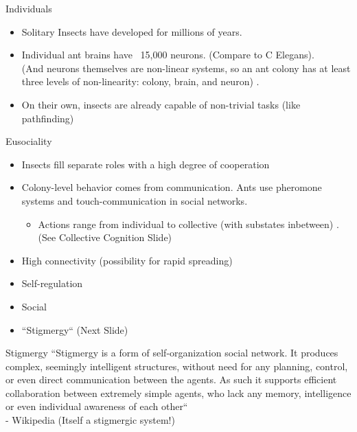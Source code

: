 \documentclass{beamer}
\newcommand\tab[1][1cm]{\hspace*{#1}}
\begin{document}
  \begin{frame}{Individuals}
      \begin{itemize}
          \item Solitary Insects have developed for millions of years.
          \item Individual ant brains have ~15,000 neurons. (Compare to C Elegans). \\
              \tiny (And neurons themselves are non-linear systems, so an ant colony has at least three levels of non-linearity: colony, brain, and neuron) \cite{koch_1999}. \normalsize
          \item On their own, insects are already capable of non-trivial tasks (like pathfinding)
      \end{itemize}
  \end{frame}

  \begin{frame}{Eusociality}
      \begin{itemize}
          \item Insects fill separate roles with a high degree of cooperation \normalsize \cite{gelblum2015ant}
          \item Colony-level behavior comes from communication. Ants use pheromone systems and touch-communication in social networks. \cite{fewell_2003}
              \begin{itemize}
                  \item Actions range from individual to collective (with substates inbetween) \cite{feinerman2017individual}. \tiny (See Collective Cognition Slide) \normalsize
              \end{itemize}
          \item High connectivity (possibility for rapid spreading) \cite{gernat2018automated}
          \item Self-regulation \cite{heyman2017ants}
          \item Social
          \item ``Stigmergy`` (Next Slide) \cite{fonio2016locally}
      \end{itemize}
  \end{frame}

  \begin{frame}{Stigmergy}
      ``Stigmergy is a form of self-organization social network. It produces complex, seemingly intelligent structures, without need for any planning, control, or even direct communication between the agents. As such it supports efficient collaboration between extremely simple agents, who lack any memory, intelligence or even individual awareness of each other`` \\ \tab - Wikipedia (Itself a stigmergic system!)
  \end{frame} 
\end{document}
